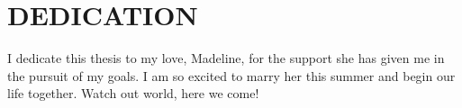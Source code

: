 \chapter*{DEDICATION}

I dedicate this thesis to my love, Madeline, for the support she has given me in the pursuit of my goals. I am so excited to marry her this summer and begin our life together. Watch out world, here we come!
